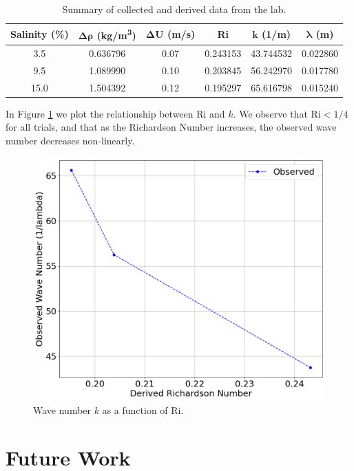 \documentclass{article}
\begin{document}
\begin{table}[h!]
    \centering
    \begin{tabular}{|c|c|c|c|c|c|}
    \hline
    \textbf{Salinity (\%)} & $\bm{\Delta \rho}$ \textbf{(kg/m\textsuperscript{3})} & $\bm{\Delta U}$ \textbf{(m/s)}& \textbf{Ri} & $\bm{k}$ \textbf{(1/m)}& $\bm{\lambda}$ \textbf{(m)}\\ \hline
    3.5 & 0.636796 & 0.07 & 0.243153 & 43.744532 & 0.022860 \\
    9.5 & 1.089990 & 0.10 & 0.203845 & 56.242970 & 0.017780 \\
    15.0 & 1.504392 & 0.12 & 0.195297 & 65.616798 & 0.015240 \\
    \hline
    \end{tabular}
    \caption{Summary of collected and derived data from the lab.}
    \label{tab:data}
\end{table}

In Figure \ref{graph:Ri-vs-k} we plot the relationship between Ri and \(k\). We
observe that \(\text{Ri} < 1/4\) for all trials, and that as the Richardson
Number increases, the observed wave number decreases non-linearly.

\begin{figure}[h!]
    \centering
    \includegraphics[width=5in]{RivsK.png}
    \caption{Wave number $k$ as a function of Ri.}
    \label{graph:Ri-vs-k}
\end{figure}

\section{Future Work}
\end{document}
